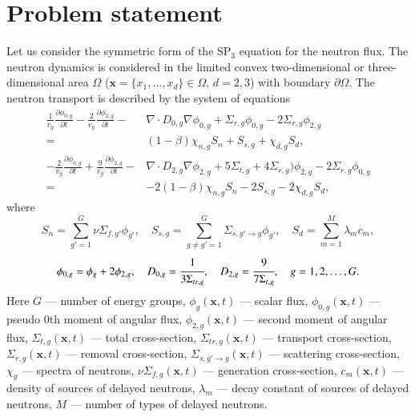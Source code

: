 \documentclass[preprint]{elsarticle}
\begin{document}
\section{Problem statement}
Let us consider the symmetric form of the SP$_3$ equation for the neutron flux.
The neutron dynamics is considered in the limited convex two-dimensional or three-dimensional area $\Omega$ ($\bm x = \{x_1, ..., x_d\} \in \Omega, \, d = 2,3$) with boundary $\partial \Omega$.
The neutron transport is described by the system of equations
\begin{equation}\label{1}
\begin{split}
	\frac{1}{v_g} \frac{\partial \phi_{0,g}}{\partial t} - 
	\frac{2}{v_g} \frac{\partial \phi_{2,g}}{\partial t} - 
	& \nabla \cdot D_{0,g} \nabla \phi_{0,g} + 
	  \Sigma_{r,g} \phi_{0,g} -  
	2 \Sigma_{r,g} \phi_{2,g} \\ 
	= & (1 - \beta) \chi_{n,g} S_{n} + S_{s,g} + \chi_{d,g} S_d, \\
	- \frac{2}{v_g} \frac{\partial \phi_{0,g}}{\partial t} + 
	  \frac{9}{v_g} \frac{\partial \phi_{2,g}}{\partial t} - 
	& \nabla \cdot D_{2,g} \nabla \phi_{2,g} + 
	5 \Sigma_{t,g} + 4\Sigma_{r,g}) \phi_{2,g} - 
	2 \Sigma_{r,g} \phi_{0,g} \\
	= & - 2(1 - \beta) \chi_{n,g} S_{n} - 2 S_{s,g} - 2 \chi_{d,g} S_d,
\end{split}
\end{equation}
where
\[
	S_{n} = \sum_{g'=1}^{G} \nu \Sigma_{f,g'} \phi_{g'}, \quad
	S_{s,g} = \sum_{g\neq g'=1}^{G} \Sigma_{s,g' \rightarrow g} \phi_{g'}, \quad
	S_{d} = \sum_{m=1}^{M} \lambda_m c_m,
\]
\[
	\phi_{0,g} = \phi_g + 2\phi_{2,g}, \quad
	D_{0,g} = \cfrac{1}{3 \Sigma_{tr,g}}, \quad
	D_{2,g} = \cfrac{9}{7 \Sigma_{t,g}}, \quad 
	g = 1,2,\dots,G.
\]
Here $G$ --- number of energy groups,
$\phi_g(\bm x, t)$ --- scalar flux,
$\phi_{0,g}(\bm x, t)$ --- pseudo 0th moment of angular flux,
$\phi_{2,g}(\bm x, t)$ --- second moment of angular flux,
$\Sigma_{t,g}(\bm x, t)$ --- total cross-section,
$\Sigma_{tr,g}(\bm x, t)$ --- transport cross-section, 
$\Sigma_{r,g}(\bm x, t)$ --- removal cross-section,
$\Sigma_{s,g' \rightarrow g}(\bm x, t)$ --- scattering cross-section,
$\chi_g$  --- spectra of neutrons,
$\nu \Sigma_{f,g}(\bm x, t)$ --- generation cross-section,
$c_m(\bm x, t)$ --- density of sources of delayed neutrons,
$\lambda_m$ --- decay constant of sources of delayed neutrons,
$M$ --- number of types of delayed neutrons.
\end{document}
